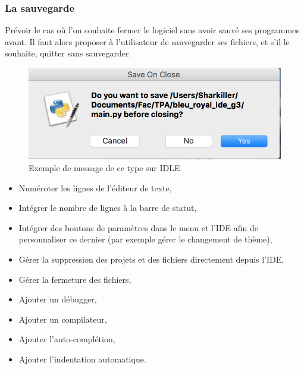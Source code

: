 \documentclass[a4paper,12pt]{article}
\begin{document}
	\subsubsection*{La sauvegarde}
	
		Prévoir le cas où l'on souhaite fermer le logiciel sans avoir sauvé ses programmes avant. Il faut alors proposer à l'utilisateur de sauvegarder ses fichiers, et s'il le souhaite, quitter sans sauvegarder.
		
		\begin{figure}[h!]
			\begin{center}
				\includegraphics[scale=0.5]{images/save_on_close}
				\caption{Exemple de message de ce type sur IDLE}
			\end{center}
		\end{figure}
		
	\begin{itemize}
			\item Numéroter les lignes de l'éditeur de texte,
			\item Intégrer le nombre de lignes à la barre de statut,
			\item Intégrer des boutons de paramètres dans le menu et l'IDE afin de personnaliser ce dernier (par exemple gérer le changement de thème),
			\item Gérer la suppression des projets et des fichiers directement depuis l'IDE,
			\item Gérer la fermeture des fichiers,
			\item Ajouter un débugger,
			\item Ajouter un compilateur,
			\item Ajouter l'auto-complétion,
			\item Ajouter l'indentation automatique.
	\end{itemize}
\end{document}
